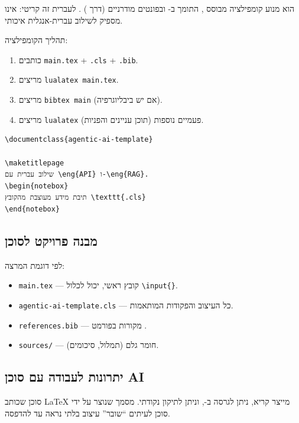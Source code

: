  הוא מנוע קומפילציה מבוסס , התומך ב-
ובפונטים מודרניים (דרך ) \cite{polyglossia2023}. לעברית
זה קריטי:  אינו מספיק לשילוב עברית-אנגלית איכותי.

תהליך הקומפילציה:
\begin{enumerate}[rightmargin=2em]
  \item כותבים \texttt{main.tex} + \texttt{.cls} + \texttt{.bib}.
  \item מריצים \texttt{lualatex main.tex}.
  \item מריצים \texttt{bibtex main} (אם יש ביבליוגרפיה).
  \item מריצים \texttt{lualatex} פעמיים נוספות (תוכן עניינים והפניות).
\end{enumerate}

\begin{lstlisting}[caption={דוגמת שימוש בפקודות התבנית}]
\documentclass{agentic-ai-template}

\maketitlepage
שילוב עברית עם \eng{API} ו-\eng{RAG}.
\begin{notebox}
תיבת מידע מעוצבת מהקובץ \texttt{.cls}
\end{notebox}

\end{lstlisting}

\subsection{מבנה פרויקט לסוכן}

לפי דוגמת המרצה:
\begin{itemize}[rightmargin=2em]
  \item \texttt{main.tex} --- קובץ ראשי, יכול לכלול \texttt{\textbackslash input\{\}}.
  \item \texttt{agentic-ai-template.cls} --- כל העיצוב והפקודות המותאמות.
  \item \texttt{references.bib} --- מקורות בפורמט .
  \item \texttt{sources/} --- חומר גלם (תמלול, סיכומים).
\end{itemize}

\subsection{יתרונות לעבודה עם סוכן AI}

\begin{insightbox}
סוכן שכותב \LaTeX{} מייצר  קריא, ניתן לגרסה ב-, וניתן
לתיקון נקודתי. מסמך  שנוצר על ידי סוכן לעיתים ``שובר'' עיצוב
בלתי נראה עד להדפסה.
\end{insightbox}

